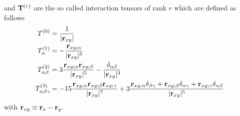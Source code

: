 \documentclass[a4paper,titlepage,twoside,fleqn,12pt]{book}
\begin{document}
\begin{refsection}
and ${\bf T}^{(r)}$ are the so called interaction tensors of rank $r$ which are defined as follows
%
\begin{subequations}
\label{e:interaction-tensors}
\begin{align}
  T^{(0)} &= \frac{1}{\rvert {\bf r}_{xy} \lvert}  \label{e:interaction-tensors-1} \\
  T^{(1)}_\alpha &=-\frac{{\bf r}_{xy;\alpha}}{\rvert {\bf r}_{xy} \lvert^3}  \label{e:interaction-tensors-2} \\
  T^{(2)}_{\alpha\beta} &=3\frac{{\bf r}_{xy;\alpha} {\bf r}_{xy;\beta} }{\rvert {\bf r}_{xy} \lvert^5}  
      - \frac{\delta_{\alpha\beta}}{\rvert {\bf r}_{xy} \lvert^3}             \label{e:interaction-tensors-3} \\
  T^{(3)}_{\alpha\beta\gamma} &= -15 
         \frac{{\bf r}_{xy;\alpha} {\bf r}_{xy;\beta} {\bf r}_{xy;\gamma} }{\rvert {\bf r}_{xy} \lvert^7}
                  +3 \frac{{\bf r}_{xy;\alpha} \delta_{\beta\gamma}+
                           {\bf r}_{xy;\beta}  \delta_{\alpha\gamma}+
                           {\bf r}_{xy;\gamma} \delta_{\alpha\beta}}{\rvert {\bf r}_{xy} \lvert^5} \label{e:interaction-tensors-4}
\end{align}
\end{subequations}
%
with ${\bf r}_{xy} \equiv {\bf r}_x - {\bf r}_y$.


\end{refsection}
\end{document}
